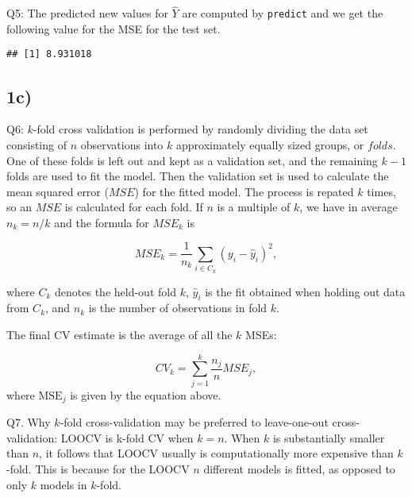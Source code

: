\documentclass[]{article}
\newenvironment{Shaded}{\begin{snugshade}}{\end{snugshade}}
\newcommand{\KeywordTok}[1]{\textcolor[rgb]{0.13,0.29,0.53}{\textbf{#1}}}
\newcommand{\DecValTok}[1]{\textcolor[rgb]{0.00,0.00,0.81}{#1}}
\newcommand{\OperatorTok}[1]{\textcolor[rgb]{0.81,0.36,0.00}{\textbf{#1}}}
\newcommand{\NormalTok}[1]{#1}
\begin{document}
Q5: The predicted new values for \(\hat Y\) are computed by
\texttt{predict} and we get the following value for the MSE for the test
set.

\begin{Shaded}
\end{Shaded}

\begin{verbatim}
## [1] 8.931018
\end{verbatim}

\subsection{1c)}\label{c}

Q6: \(k\)-fold cross validation is performed by randomly dividing the
data set consisting of \(n\) observations into \(k\) approximately
equally sized groups, or \(folds\). One of these folds is left out and
kept as a validation set, and the remaining \(k-1\) folds are used to
fit the model. Then the validation set is used to calculate the mean
squared error (\(MSE\)) for the fitted model. The process is repated
\(k\) times, so an \(MSE\) is calculated for each fold. If \(n\) is a
multiple of \(k\), we have in average \(n_k=n/k\) and the formula for
\(MSE_k\) is

\[
MSE_k=\frac{1}{n_k}\sum_{i \in C_k}(y_i-\hat y_i)^2,
\]

where \(C_k\) denotes the held-out fold \(k\), \(\hat y_i\) is the fit
obtained when holding out data from \(C_k\), and \(n_k\) is the number
of observations in fold \(k\).

The final CV estimate is the average of all the \(k\) MSEs:

\[
CV_k=\sum_{j=1}^k \frac{n_j}{n}MSE_j,
\] where \(\text{MSE}_j\) is given by the equation above.

Q7. Why \(k\)-fold cross-validation may be preferred to leave-one-out
cross-validation: LOOCV is k-fold CV when \(k=n\). When \(k\) is
substantially smaller than \(n\), it follows that LOOCV usually is
computationally more expensive than \(k\)-fold. This is because for the
LOOCV \(n\) different models is fitted, as opposed to only \(k\) models
in \(k\)-fold.
\end{document}

